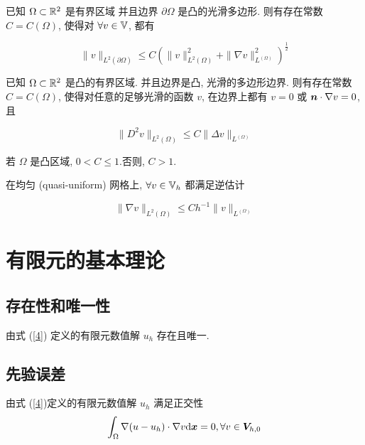\documentclass{article}
\begin{document}
\begin{theorem}
    已知 $\Omega \subset {\mathbb R}^2$ 是有界区域
    并且边界 $\partial \Omega$ 是凸的光滑多边形. 
    则有存在常数 $C = C(\Omega)$, 使得对 $\forall v \in {\mathbb V}$, 都有

    \begin{equation}
        \|v\|_{L^2(\partial \Omega)} \le C 
        (\|v\|^2_{L^2(\Omega)} + \|\nabla v\|^2_{L^(\Omega)})^{\frac{1}{2}}
    \end{equation}
\end{theorem}


\begin{theorem}
    已知 $\Omega \subset {\mathbb R}^2$ 是凸的有界区域. 
    并且边界是凸, 光滑的多边形边界. 
    则有存在常数 $C = C(\Omega)$, 使得对任意的足够光滑的函数 $v$, 在边界上都有
    $v = 0$ 或 ${\boldsymbol n} \cdot \nabla v = 0$, 且

    \begin{equation}
        \|D^2 v\|_{L^2(\Omega)} \le C \|\Delta v\|_{L^(\Omega)}
    \end{equation}

    若 $\Omega$ 是凸区域, $0 < C \le 1$.否则, $C > 1$.
\end{theorem}


\begin{theorem}
    在均匀 (quasi-uniform) 网格上, $\forall v \in {\mathbb V}_h$ 
    都满足逆估计

    \begin{equation}
        \|\nabla v\|_{L^2(\Omega)} \le C h^{-1} \|v\|_{L^(\Omega)}
    \end{equation}
\end{theorem}

\section{有限元的基本理论}

\subsection{存在性和唯一性}
\begin{theorem}
    由式 (\ref{4}) 定义的有限元数值解 $u_h$ 存在且唯一. 
\end{theorem}

\subsection{先验误差}
\begin{theorem}
    由式 (\ref{4})定义的有限元数值解 $u_h$ 满足正交性
    \begin{equation}
        \int_{\Omega} \nabla(u - u_h) \cdot \nabla v {\mathrm d} {\boldsymbol x} = 0, \forall v
        \in {\boldsymbol V}_{h, 0}
    \end{equation}
\end{theorem}
\end{document}
